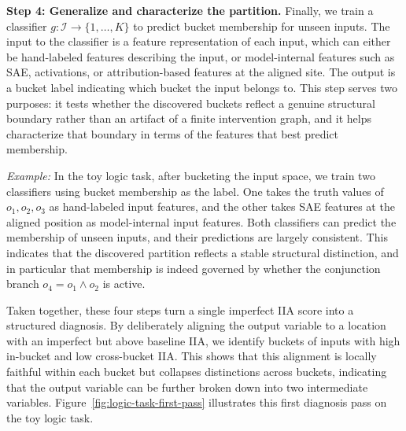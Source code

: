 \textbf{Step 4: Generalize and characterize the partition.}
Finally, we train a classifier \(g:\mathcal I \to \{1,\dots,K\}\) to predict bucket membership for unseen inputs. The input to the classifier is a feature representation of each input, which can either be hand-labeled features describing the input, or model-internal features such as SAE, activations, or attribution-based features at the aligned site. The output is a bucket label indicating which bucket the input belongs to. This step serves two purposes: it tests whether the discovered buckets reflect a genuine structural boundary rather than an artifact of a finite intervention graph, and it helps characterize that boundary in terms of the features that best predict membership.

\textit{Example:} In the toy logic task, after bucketing the input space, we train two classifiers using bucket membership as the label. One takes the truth values of \(o_1,o_2,o_3\) as hand-labeled input features, and the other takes SAE features at the aligned position as model-internal input features. Both classifiers can predict the membership of unseen inputs, and their predictions are largely consistent. This indicates that the discovered partition reflects a stable structural distinction, and in particular that membership is indeed governed by whether the conjunction branch \(o_4=o_1\wedge o_2\) is active.



Taken together, these four steps turn a single imperfect IIA score into a structured diagnosis. By deliberately aligning the output variable to a location with an imperfect but above baseline IIA, we identify buckets of inputs with high in-bucket and low cross-bucket IIA. This shows that this alignment is locally faithful within each bucket but collapses distinctions across buckets, indicating that the output variable can be further broken down into two intermediate variables. Figure~\ref{fig:logic-task-first-pass} illustrates this first diagnosis pass on the toy logic task.

